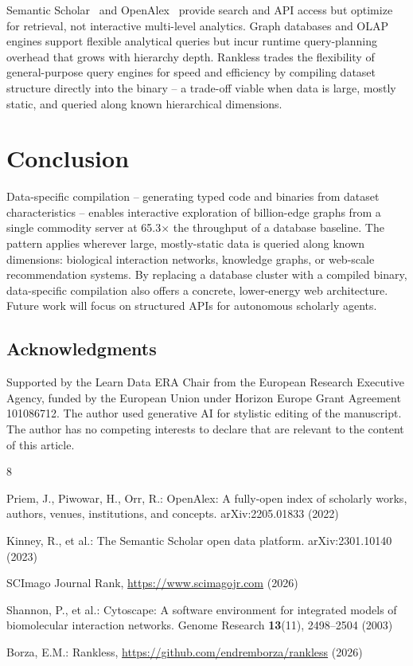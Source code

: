 \documentclass{article}
\newcommand{\evalSpeedup}{65.3}
\begin{document}
Semantic Scholar~\cite{semscholar} and OpenAlex~\cite{openalex} provide search and API access but optimize for retrieval, not interactive multi-level analytics. Graph databases and OLAP engines support flexible analytical queries but incur runtime query-planning overhead that grows with hierarchy depth. Rankless trades the flexibility of general-purpose query engines for speed and efficiency by compiling dataset structure directly into the binary -- a trade-off viable when data is large, mostly static, and queried along known hierarchical dimensions.

%
\section{Conclusion}
\label{sec:conclusion}

Data-specific compilation -- generating typed code and binaries from dataset characteristics -- enables interactive exploration of billion-edge graphs from a single commodity server at \evalSpeedup{}$\times$ the throughput of a database baseline. The pattern applies wherever large, mostly-static data is queried along known dimensions: biological interaction networks, knowledge graphs, or web-scale recommendation systems. By replacing a database cluster with a compiled binary, data-specific compilation also offers a concrete, lower-energy web architecture. Future work will focus on structured APIs for autonomous scholarly agents.

%
\subsection*{Acknowledgments}
Supported by the Learn Data ERA Chair from the European Research Executive Agency, funded by the European Union under Horizon Europe Grant Agreement 101086712.
The author used generative AI for stylistic editing of the manuscript.
The author has no competing interests to declare that are relevant to the content of this article.
%
\begin{thebibliography}{8}

Priem, J., Piwowar, H., Orr, R.: OpenAlex: A fully-open index of scholarly works, authors, venues, institutions, and concepts. arXiv:2205.01833 (2022)

Kinney, R., et al.: The Semantic Scholar open data platform. arXiv:2301.10140 (2023)

SCImago Journal Rank, \url{https://www.scimagojr.com} (2026)

Shannon, P., et al.: Cytoscape: A software environment for integrated models of biomolecular interaction networks. Genome Research \textbf{13}(11), 2498--2504 (2003)

Borza, E.M.: Rankless, \url{https://github.com/endremborza/rankless} (2026)

\end{thebibliography}
\end{document}
